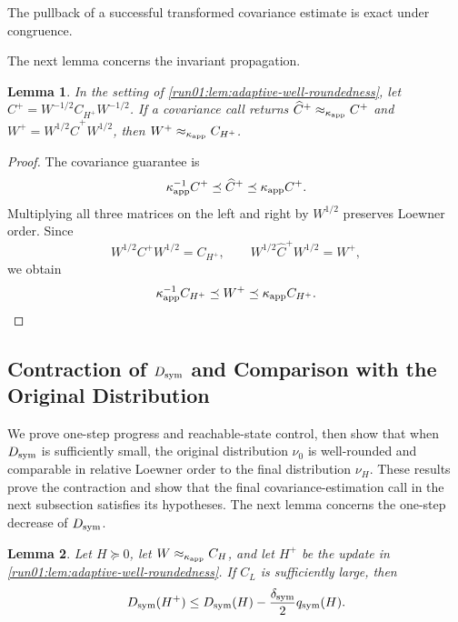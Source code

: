 \documentclass[11pt]{article}
\numberwithin{equation}{section}
\newtheorem{lemma}{Lemma}[section]
\theoremstyle{definition}
\begin{document}
The pullback of a successful transformed covariance estimate is exact under
congruence.

The next lemma concerns the invariant propagation.

\begin{lemma}
\label{run01:lem:propagation-local}
In the setting of \cref{run01:lem:adaptive-well-roundedness}, let
$C^+=W^{-1/2}C_{H^+}W^{-1/2}$.
If a covariance call returns $\widehat C^+\approx_{\kappa_{\rm app}}C^+$ and
$W^+=W^{1/2}\widehat C^+W^{1/2}$, then
$W^+\approx_{\kappa_{\rm app}}C_{H^+}$.
\end{lemma}

\begin{proof}
The covariance guarantee is
\[
\kappa_{\rm app}^{-1}C^+
\preceq \widehat C^+
\preceq \kappa_{\rm app}C^+.
\]
Multiplying all three matrices on the left and right by $W^{1/2}$ preserves
Loewner order.
Since
\[
W^{1/2}C^+W^{1/2}=C_{H^+},
\qquad
W^{1/2}\widehat C^+W^{1/2}=W^+,
\]
we obtain
\[
\kappa_{\rm app}^{-1}C_{H^+}
\preceq W^+
\preceq \kappa_{\rm app}C_{H^+}.
\]
\end{proof}
\space

\subsection{Contraction of \texorpdfstring{$D_{\rm sym}$}{D sym} and Comparison with the Original Distribution}
\label{sec:symmetric-progress}

We prove one-step progress and reachable-state control, then show that when
$D_{\rm sym}$ is sufficiently small, the original distribution
$\nu_0$ is well-rounded and comparable in relative Loewner order to the final
distribution
$\nu_H$.
These results prove the contraction and show that the final
covariance-estimation call in the next subsection satisfies its hypotheses.
The next lemma concerns the one-step decrease of $D_{\rm sym}$.

\begin{lemma}
\label{run01:lem:deficit-step-local}
Let $H\succeq0$, let
$W\approx_{\kappa_{\rm app}}C_H$, and let
$H^+$ be the update in \cref{run01:lem:adaptive-well-roundedness}.
If $C_L$ is sufficiently large, then
\[
 D_{\rm sym}(H^+)\leq D_{\rm sym}(H)
 -\frac{\delta_{\rm sym}}2q_{\rm sym}(H).
\]
\end{lemma}
\end{document}
